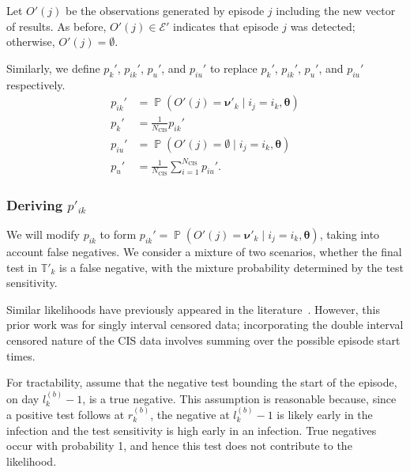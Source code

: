 \documentclass[12pt]{article}
\DeclareMathOperator{\prob}{\mathbb{P}}
\newcommand\set{\mathcal}
\renewcommand{\vec}[1]{\bm{#1}}
\newcommand{\Ncis}{N_\text{CIS}}
\newcommand{\sched}{\mathbb{T}}
\begin{document}
Let $O'(j)$ be the observations generated by episode $j$ including the new vector of results.
As before, $O'(j) \in \set{E}'$ indicates that episode $j$ was detected; otherwise, $O'(j) = \emptyset$.

Similarly, we define $p_k'$, $p_{ik}'$, $p_u'$, and $p_{iu}'$ to replace $p_k'$, $p_{ik}'$, $p_u'$, and $p_{iu}'$ respectively.
\begin{align}
    p_{ik}' &= \prob(O'(j) = \vec{\nu}'_k \mid i_j = i_k, \vec{\theta}) \\
    p_k' &= \frac{1}{\Ncis} p_{ik}' \\
    p_{iu}' &= \prob(O'(j) = \emptyset \mid i_j = i_k, \vec{\theta}) \\
    p_u' &= \frac{1}{\Ncis} \sum_{i=1}^{\Ncis} p_{iu}'.
\end{align}

\subsubsection{Deriving $p'_{ik}$} \label{imperf-test:sec:modifying-p_ia}

We will modify $p_{ik}$ to form $p_{ik}' = \prob(O'(j) = \vec{\nu}'_k \mid i_j = i_k, \vec{\theta})$, taking into account false negatives.
We consider a mixture of two scenarios, whether the final test in $\sched'_{k}$ is a false negative, with the mixture probability determined by the test sensitivity.

Similar likelihoods have previously appeared in the literature~\citep[e.g.][eq.\ (2)]{piresIntervalMisclassify}.
However, this prior work was for singly interval censored data; incorporating the double interval censored nature of the CIS data involves summing over the possible episode start times.


For tractability, assume that the negative test bounding the start of the episode, on day $l_k^{(b)}-1$, is a true negative.
This assumption is reasonable because, since a positive test follows at $r_k^{(b)}$, the negative at $l_k^{(b)}-1$ is likely early in the infection and the test sensitivity is high early in an infection.
True negatives occur with probability 1, and hence this test does not contribute to the likelihood.
\end{document}

